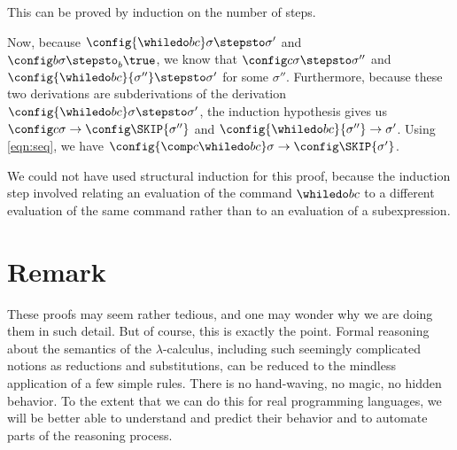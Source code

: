 \begin{itemize}
This can be proved by induction on the number of steps.

Now, because
$\config{\whiledo bc}\sigma \stepsto \sigma'$ and $\config b\sigma \stepsto_b \true$, we know that
$\config c\sigma \stepsto \sigma''$ and $\config{\whiledo bc}{\sigma''} \stepsto \sigma'$ for some $\sigma''$. Furthermore,
because these two derivations are subderivations
of the derivation $\config{\whiledo bc}\sigma\stepsto\sigma'$, the induction hypothesis gives us
$\config c\sigma \rightarrow \config\SKIP{\sigma''}$ and
$\config{\whiledo bc}{\sigma''}\rightarrow \sigma'$. Using \eqref{eqn:seq},
we have $\config{\comp c{\whiledo bc}}\sigma \rightarrow \config\SKIP{\sigma'}$.

We could not have used structural induction for this proof,
because the induction step involved relating an evaluation of the
command $\whiledo bc$ to a different evaluation of the same command
rather than to an evaluation of a subexpression.
\end{itemize}

\fi

\section{Remark}

These proofs may seem rather tedious, and one may wonder why we are doing them in such detail. But of course, this is exactly the point. Formal reasoning about the semantics of the $\lambda$-calculus, including such seemingly complicated notions as reductions and substitutions, can be reduced to the mindless application of a few simple rules. There is no hand-waving, no magic, no hidden behavior. To the extent that we can do this for real programming languages, we will be better able to understand and predict their behavior and to automate parts of the reasoning process.
